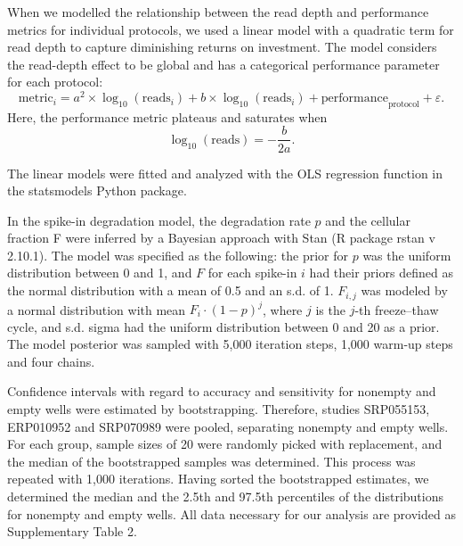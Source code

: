 When we modelled the relationship between the read depth and performance metrics for individual protocols, we used a linear model with a quadratic term for read depth to capture diminishing returns on investment. The model considers the read-depth effect to be global and has a categorical performance parameter for each protocol:
\[
\text{metric}_i = a^2 \times \log_{10}(\text{reads}_i) + b \times \log_{10}(\text{reads}_i) +  \text{performance}_\text{protocol} + \varepsilon.
\]
Here, the performance metric plateaus and saturates when
\[
\log_{10} (\text{reads}) = - \frac{b}{2a}.
\]

The linear models were fitted and analyzed with the OLS regression function in the statsmodels Python package.

In the spike-in degradation model, the degradation rate \( p \) and the cellular fraction F were inferred by a Bayesian approach with Stan \cite{Carpenter2016-zx} (R package rstan v 2.10.1). The model was specified as the following: the prior for \( p \) was the uniform distribution between 0 and 1, and \( F \) for each spike-in \( i \) had their priors defined as the normal distribution with a mean of 0.5 and an s.d. of 1. \( F_{i,j} \) was modeled by a normal distribution with mean \( F_i \cdot (1 - p)^j \), where \( j \) is the \( j \)-th freeze–thaw cycle, and s.d. {sigma} had the uniform distribution between 0 and 20 as a prior. The model posterior was sampled with 5,000 iteration steps, 1,000 warm-up steps and four chains.

Confidence intervals with regard to accuracy and sensitivity for nonempty and empty wells were estimated by bootstrapping. Therefore, studies SRP055153, ERP010952 and SRP070989 were pooled, separating nonempty and empty wells. For each group, sample sizes of 20 were randomly picked with replacement, and the median of the bootstrapped samples was determined. This process was repeated with 1,000 iterations. Having sorted the bootstrapped estimates, we determined the median and the 2.5th and 97.5th percentiles of the distributions for nonempty and empty wells. All data necessary for our analysis are provided as Supplementary Table 2.

